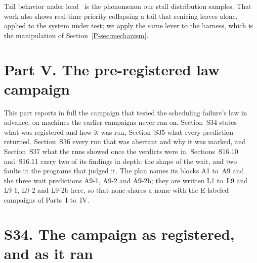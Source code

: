 \documentclass[10pt,journal,onecolumn]{IEEEtran}
\newcommand{\mainModeA}{\ref{P-sec:mechanism}}             %
\begin{document}
Tail behavior under load~\cite{li2014tales} is the phenomenon our stall distribution samples.
That work also shows real-time priority collapsing a tail that renicing leaves alone, applied
to the system under test; we apply the same lever to the harness, which is the manipulation
of Section~\mainModeA{}.

\section*{Part V. The pre-registered law campaign}

This part reports in full the campaign that tested the scheduling failure's law in advance, on
machines the earlier campaigns never ran on. Section~S34 states what was registered and how it
was run, Section~S35 what every prediction returned, Section~S36 every run that was aberrant and
why it was marked, and Section~S37 what the runs showed once the verdicts were in.
Sections~S16.10 and~S16.11 carry two of its findings in depth: the shape of the wait, and two
faults in the programs that judged it. The plan names its blocks A1 to~A9 and the three wait
predictions A9-1, A9-2 and A9-2b; they are written L1 to~L9 and L9-1, L9-2 and L9-2b here, so
that none shares a name with the E-labeled campaigns of Parts~I to~IV.

\section{S34. The campaign as registered, and as it ran}
\label{sec:lawcampaign}
\end{document}
